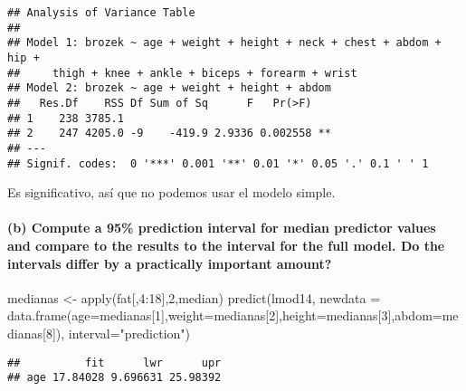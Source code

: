 \documentclass[
]{article}
\newenvironment{Shaded}{\begin{snugshade}}{\end{snugshade}}
\newcommand{\AttributeTok}[1]{\textcolor[rgb]{0.77,0.63,0.00}{#1}}
\newcommand{\DecValTok}[1]{\textcolor[rgb]{0.00,0.00,0.81}{#1}}
\newcommand{\FunctionTok}[1]{\textcolor[rgb]{0.00,0.00,0.00}{#1}}
\newcommand{\NormalTok}[1]{#1}
\newcommand{\OtherTok}[1]{\textcolor[rgb]{0.56,0.35,0.01}{#1}}
\newcommand{\SpecialCharTok}[1]{\textcolor[rgb]{0.00,0.00,0.00}{#1}}
\newcommand{\StringTok}[1]{\textcolor[rgb]{0.31,0.60,0.02}{#1}}
\begin{document}
\begin{verbatim}
## Analysis of Variance Table
## 
## Model 1: brozek ~ age + weight + height + neck + chest + abdom + hip + 
##     thigh + knee + ankle + biceps + forearm + wrist
## Model 2: brozek ~ age + weight + height + abdom
##   Res.Df    RSS Df Sum of Sq      F   Pr(>F)   
## 1    238 3785.1                                
## 2    247 4205.0 -9    -419.9 2.9336 0.002558 **
## ---
## Signif. codes:  0 '***' 0.001 '**' 0.01 '*' 0.05 '.' 0.1 ' ' 1
\end{verbatim}

Es significativo, así que no podemos usar el modelo simple.

\hypertarget{b-compute-a-95-prediction-interval-for-median-predictor-values-and-compare-to-the-results-to-the-interval-for-the-full-model.-do-the-intervals-differ-by-a-practically-important-amount}{%
\paragraph{(b) Compute a 95\% prediction interval for median predictor
values and compare to the results to the interval for the full model. Do
the intervals differ by a practically important
amount?}\label{b-compute-a-95-prediction-interval-for-median-predictor-values-and-compare-to-the-results-to-the-interval-for-the-full-model.-do-the-intervals-differ-by-a-practically-important-amount}}

\begin{Shaded}
\begin{Highlighting}[]
\NormalTok{medianas }\OtherTok{\textless{}{-}} \FunctionTok{apply}\NormalTok{(fat[,}\DecValTok{4}\SpecialCharTok{:}\DecValTok{18}\NormalTok{],}\DecValTok{2}\NormalTok{,median)}
\FunctionTok{predict}\NormalTok{(lmod14, }\AttributeTok{newdata =} \FunctionTok{data.frame}\NormalTok{(}\AttributeTok{age=}\NormalTok{medianas[}\DecValTok{1}\NormalTok{],}\AttributeTok{weight=}\NormalTok{medianas[}\DecValTok{2}\NormalTok{],}\AttributeTok{height=}\NormalTok{medianas[}\DecValTok{3}\NormalTok{],}\AttributeTok{abdom=}\NormalTok{medianas[}\DecValTok{8}\NormalTok{]), }\AttributeTok{interval=}\StringTok{"prediction"}\NormalTok{)}
\end{Highlighting}
\end{Shaded}

\begin{verbatim}
##          fit      lwr      upr
## age 17.84028 9.696631 25.98392
\end{verbatim}
\end{document}
